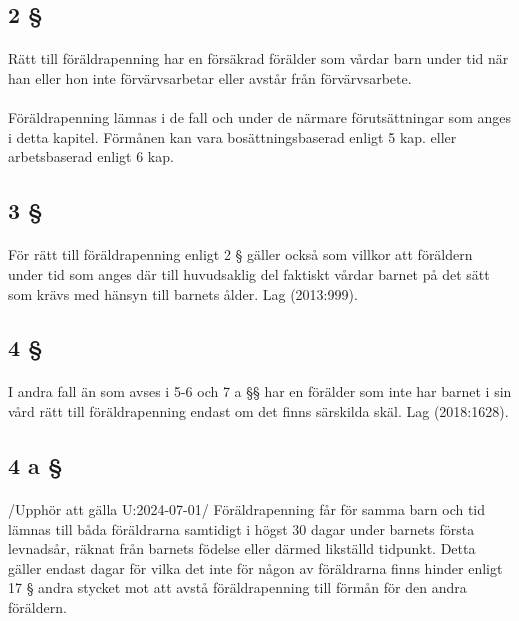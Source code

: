 \documentclass[a4paper,notitlepage,openany,10pt]{book}
\begin{document}
\subsection*{2 §}
\paragraph*{}
Rätt till föräldrapenning har en försäkrad förälder som vårdar barn under tid när han eller hon inte förvärvsarbetar eller avstår från förvärvsarbete.
\paragraph*{}
Föräldrapenning lämnas i de fall och under de närmare förutsättningar som anges i detta kapitel. Förmånen kan vara bosättningsbaserad enligt 5 kap. eller arbetsbaserad enligt 6 kap.
\subsection*{3 §}
\paragraph*{}
För rätt till föräldrapenning enligt 2 § gäller också som villkor att föräldern under tid som anges där till huvudsaklig del faktiskt vårdar barnet på det sätt som krävs med hänsyn till barnets ålder.
Lag (2013:999).
\subsection*{4 §}
\paragraph*{}
I andra fall än som avses i 5-6 och 7 a §§ har en förälder som inte har barnet i sin vård rätt till föräldrapenning endast om det finns särskilda skäl.
Lag (2018:1628).
\subsection*{4 a §}
\paragraph*{}
/Upphör att gälla U:2024-07-01/
Föräldrapenning får för samma barn och tid lämnas till båda föräldrarna samtidigt i högst 30 dagar under barnets första levnadsår, räknat från barnets födelse eller därmed likställd tidpunkt. Detta gäller endast dagar för vilka det inte för någon av föräldrarna finns hinder enligt 17 § andra stycket mot att avstå föräldrapenning till förmån för den andra föräldern.
\end{document}
